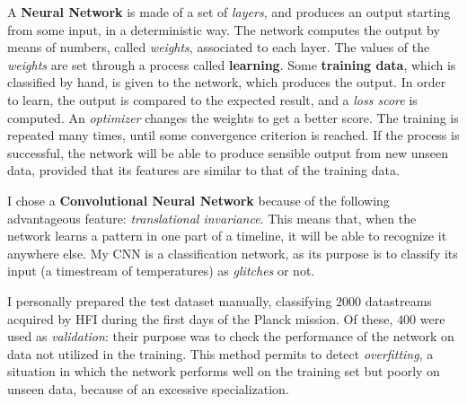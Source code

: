 \documentclass[12pt,a4paper,final]{report}			%
\begin{document}
	A \textbf{Neural Network} is made of a set of \textit{layers}, and produces an output starting from some input, in a deterministic way. The network computes the output by means of numbers, called \textit{weights}, associated to each layer. The values of the \textit{weights} are set through a process called \textbf{learning}.
	Some \textbf{training data}, which is classified by hand, is given to the network, which produces the output. In order to learn, the output is compared to the expected result, and a \textit{loss score} is computed. An \textit{optimizer} changes the weights to get a better score. The training is repeated many times, until some convergence criterion is reached. If the process is successful, the network will be able to produce sensible output from new unseen data, provided that its features are similar to that of the training data.
	
	I chose a \textbf{Convolutional Neural Network} because of the following advantageous feature: \textit{translational invariance}. This means that, when the network learns a pattern in one part of a timeline, it will be able to recognize it anywhere else. My CNN is a classification network, as its purpose is to classify its input (a timestream of temperatures) as \textit{glitches} or not.
	
%	

	I personally prepared the test dataset manually, classifying $2000$ datastreams acquired by HFI during the first days of the Planck mission. Of these, $400$ were used as \textit{validation}: their purpose was to check the performance of the network on data not utilized in the training. 
	This method permits to detect \textit{overfitting}, a situation in which the network performs well on the training set but poorly on unseen data, because of an excessive specialization. 
	
\end{document}
